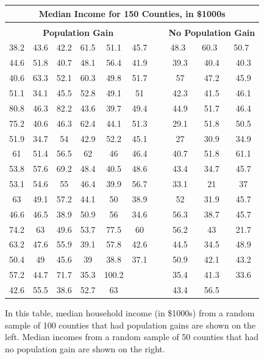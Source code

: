 \newcommand{\npgpad}[1]{\hspace{2mm}#1\hspace{1.5mm}\ }
\begin{figure}
\begin{center}
\begin{tabular}{ ccc ccc c ccc }
\multicolumn{10}{c}{\bf Median Income for 150 Counties,
    in \$1000s} \\
\hline
\vspace{-2mm} \\
\multicolumn{6}{c}{\bf Population Gain} &\hspace{5mm}\ &
    \multicolumn{3}{c}{\bf No Population Gain} \\ 
  \cline{1-6} \cline{8-10}
38.2 & 43.6 & 42.2 & 61.5 & 51.1 & 45.7 &&
    \npgpad{48.3} & \npgpad{60.3} & \npgpad{50.7} \\
44.6 & 51.8 & 40.7 & 48.1 & 56.4 & 41.9 && 39.3 & 40.4 & 40.3 \\
40.6 & 63.3 & 52.1 & 60.3 & 49.8 & 51.7 && 57 & 47.2 & 45.9 \\
51.1 & 34.1 & 45.5 & 52.8 & 49.1 & 51 && 42.3 & 41.5 & 46.1 \\
80.8 & 46.3 & 82.2 & 43.6 & 39.7 & 49.4 && 44.9 & 51.7 & 46.4 \\
75.2 & 40.6 & 46.3 & 62.4 & 44.1 & 51.3 && 29.1 & 51.8 & 50.5 \\
51.9 & 34.7 & 54 & 42.9 & 52.2 & 45.1 && 27 & 30.9 & 34.9 \\
61 & 51.4 & 56.5 & 62 & 46 & 46.4 && 40.7 & 51.8 & 61.1 \\
53.8 & 57.6 & 69.2 & 48.4 & 40.5 & 48.6 && 43.4 & 34.7 & 45.7 \\
53.1 & 54.6 & 55 & 46.4 & 39.9 & 56.7 && 33.1 & 21 & 37 \\
63 & 49.1 & 57.2 & 44.1 & 50 & 38.9 && 52 & 31.9 & 45.7 \\
46.6 & 46.5 & 38.9 & 50.9 & 56 & 34.6 && 56.3 & 38.7 & 45.7 \\
74.2 & 63 & 49.6 & 53.7 & 77.5 & 60 && 56.2 & 43 & 21.7 \\
63.2 & 47.6 & 55.9 & 39.1 & 57.8 & 42.6 && 44.5 & 34.5 & 48.9 \\
50.4 & 49 & 45.6 & 39 & 38.8 & 37.1 && 50.9 & 42.1 & 43.2 \\
57.2 & 44.7 & 71.7 & 35.3 & 100.2 &  && 35.4 & 41.3 & 33.6 \\
42.6 & 55.5 & 38.6 & 52.7 & 63 &  && 43.4 & 56.5 &  \\
\cline{1-6} \cline{8-10}
\end{tabular}
\caption{In this table, median household income (in \$1000s)
    from a random sample of 100 counties that had population
    gains are shown on the left.
    Median incomes from a random sample of 50 counties that
    had no population gain are shown on the right.}
\label{countyIncomeSplitByPopGainTable}
\end{center}
\end{figure}

